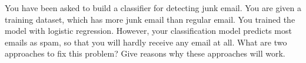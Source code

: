You have been asked to build a classifier for detecting junk email. You are given a training dataset, which has more junk email than regular email. You trained the model with logistic regression. However, your classification model predicts most emails as spam, so that you will hardly receive any email at all. What are two approaches to fix this problem? Give reasons why these approaches will work.
